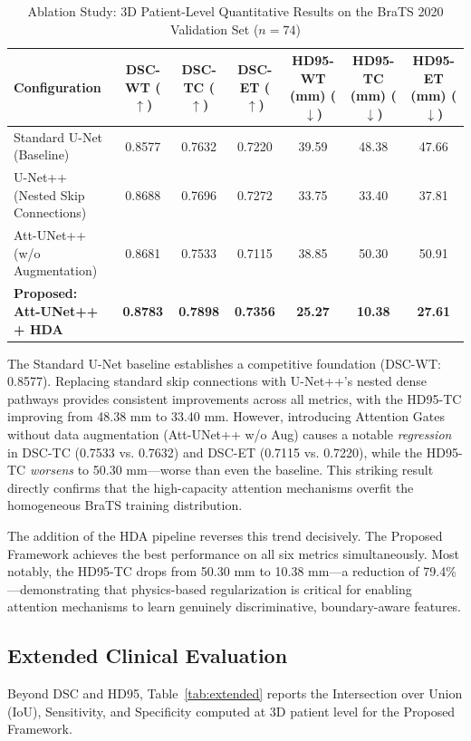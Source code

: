 \documentclass[conference]{IEEEtran}
\begin{document}
\begin{table}[t]
\centering
\caption{Ablation Study: 3D Patient-Level Quantitative Results on the BraTS 2020 Validation Set ($n=74$)}
\label{tab:ablation}
\begin{tabular}{@{}lcccccc@{}}
\toprule
\textbf{Configuration} & \textbf{DSC-WT} ($\uparrow$) & \textbf{DSC-TC} ($\uparrow$) & \textbf{DSC-ET} ($\uparrow$) & \textbf{HD95-WT (mm)} ($\downarrow$) & \textbf{HD95-TC (mm)} ($\downarrow$) & \textbf{HD95-ET (mm)} ($\downarrow$) \\ \midrule
Standard U-Net (Baseline) & 0.8577 & 0.7632 & 0.7220 & 39.59 & 48.38 & 47.66 \\
U-Net++ (Nested Skip Connections) & 0.8688 & 0.7696 & 0.7272 & 33.75 & 33.40 & 37.81 \\
Att-UNet++ (w/o Augmentation) & 0.8681 & 0.7533 & 0.7115 & 38.85 & 50.30 & 50.91 \\
\textbf{Proposed: Att-UNet++ + HDA} & \textbf{0.8783} & \textbf{0.7898} & \textbf{0.7356} & \textbf{25.27} & \textbf{10.38} & \textbf{27.61} \\ \bottomrule
\end{tabular}
\end{table}

The Standard U-Net baseline establishes a competitive foundation (DSC-WT: 0.8577). Replacing standard skip connections with U-Net++'s nested dense pathways provides consistent improvements across all metrics, with the HD95-TC improving from 48.38 mm to 33.40 mm. However, introducing Attention Gates without data augmentation (Att-UNet++ w/o Aug) causes a notable \textit{regression} in DSC-TC (0.7533 vs. 0.7632) and DSC-ET (0.7115 vs. 0.7220), while the HD95-TC \textit{worsens} to 50.30 mm—worse than even the baseline. This striking result directly confirms that the high-capacity attention mechanisms overfit the homogeneous BraTS training distribution.

The addition of the HDA pipeline reverses this trend decisively. The Proposed Framework achieves the best performance on all six metrics simultaneously. Most notably, the HD95-TC drops from 50.30 mm to 10.38 mm—a reduction of 79.4\%—demonstrating that physics-based regularization is critical for enabling attention mechanisms to learn genuinely discriminative, boundary-aware features.

\subsection{Extended Clinical Evaluation}
Beyond DSC and HD95, Table~\ref{tab:extended} reports the Intersection over Union (IoU), Sensitivity, and Specificity computed at 3D patient level for the Proposed Framework.
\end{document}
